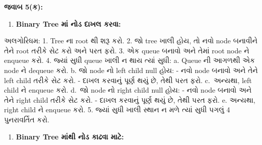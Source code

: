 \textbf{જવાબ 5(ક):}

\begin{enumerate}
\def\labelenumi{\arabic{enumi}.}
\tightlist
\item
  \textbf{Binary Tree માં નોડ દાખલ કરવા:}
\end{enumerate}

અલગોરિધમ: 1. Tree ના root થી શરૂ કરો. 2. જો tree ખાલી હોય, તો નવો node
બનાવીને તેને root તરીકે સેટ કરો અને પરત ફરો. 3. એક queue બનાવો અને તેમાં root
node ને enqueue કરો. 4. જ્યાં સુધી queue ખાલી ન થાય ત્યાં સુધી: a. Queue ની
આગળથી એક node ને dequeue કરો. b. જો node નો left child null હોય: - નવો
node બનાવો અને તેને left child તરીકે સેટ કરો. - દાખલ કરવાનું પૂર્ણ થયું છે, તેથી પરત
ફરો. c.~અન્યથા, left child ને enqueue કરો. d.~જો node નો right child null
હોય: - નવો node બનાવો અને તેને right child તરીકે સેટ કરો. - દાખલ કરવાનું પૂર્ણ થયું
છે, તેથી પરત ફરો. e. અન્યથા, right child ને enqueue કરો. 5. જ્યાં સુધી ખાલી
સ્થાન ન મળે ત્યાં સુધી પગલું 4 પુનરાવર્તિત કરો.

\begin{Shaded}
\begin{Highlighting}[]
\end{Highlighting}
\end{Shaded}

\begin{enumerate}
\def\labelenumi{\arabic{enumi}.}
\setcounter{enumi}{1}
\tightlist
\item
  \textbf{Binary Tree માંથી નોડ કાઢવા માટે:}
\end{enumerate}

